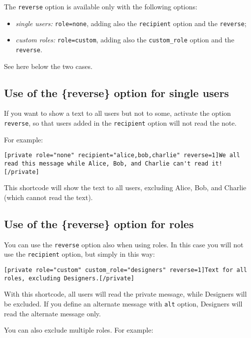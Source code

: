 The \verb+reverse+ option is available only with the following options:

\begin{itemize}
 \item \textit{single users:} \verb+role=none+, adding also the \verb+recipient+ option
 and the \verb+reverse+;
 \item \textit{custom roles:} \verb+role=custom+, adding also the \verb+custom_role+
 option and the \verb+reverse+.
\end{itemize}

See here below the two cases.

\subsection{Use of the \{reverse\} option for single users}

If you want to show a text to all users but not to some, activate the option
\verb+reverse+, so that users added in the \verb+recipient+ option will not read
the note.

For example:

\begin{lstlisting}
[private role="none" recipient="alice,bob,charlie" reverse=1]We all read this message while Alice, Bob, and Charlie can't read it![/private]
\end{lstlisting}

This shortcode will show the text to all users, excluding Alice, Bob, and
Charlie (which cannot read the text).

\subsection{Use of the \{reverse\} option for roles}

You can use the \verb+reverse+ option also when using roles. In this case you
will not use the \verb+recipient+ option, but simply in this way:

\begin{lstlisting}
[private role="custom" custom_role="designers" reverse=1]Text for all roles, excluding Designers.[/private]
\end{lstlisting}

With this shortcode, all users will read the private message, while Designers
will be excluded. If you define an alternate message with \verb+alt+ option,
Designers will read the alternate message only.

You can also exclude multiple roles. For example:

